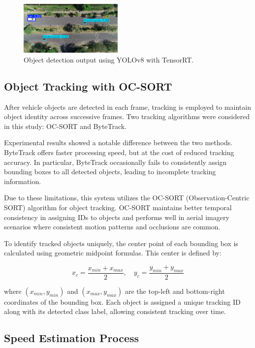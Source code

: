 \begin{figure}[H]
    \centering
    \includegraphics[width=0.45\textwidth]{gambar/deteksiobjek.png}
    \caption{Object detection output using YOLOv8 with TensorRT.}
    \label{fig:deteksiobjek}
\end{figure}


\subsection{Object Tracking with OC-SORT}

After vehicle objects are detected in each frame, tracking is employed to maintain object identity across successive frames. Two tracking algorithms were considered in this study: OC-SORT and ByteTrack.

Experimental results showed a notable difference between the two methods. ByteTrack offers faster processing speed, but at the cost of reduced tracking accuracy. In particular, ByteTrack occasionally fails to consistently assign bounding boxes to all detected objects, leading to incomplete tracking information.

Due to these limitations, this system utilizes the OC-SORT (Observation-Centric SORT) algorithm for object tracking. OC-SORT maintains better temporal consistency in assigning IDs to objects and performs well in aerial imagery scenarios where consistent motion patterns and occlusions are common.

To identify tracked objects uniquely, the center point of each bounding box is calculated using geometric midpoint formulas. This center is defined by:

\begin{equation}
    x_c = \frac{x_{min} + x_{max}}{2}, \quad
    y_c = \frac{y_{min} + y_{max}}{2}
\end{equation}

where $(x_{min}, y_{min})$ and $(x_{max}, y_{max})$ are the top-left and bottom-right coordinates of the bounding box. Each object is assigned a unique tracking ID along with its detected class label, allowing consistent tracking over time.

\subsection{Speed Estimation Process}


